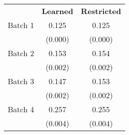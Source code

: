 
\begin{tabular}[t]{lcc}
 & \textbf{Learned}& \textbf{Restricted} \\ 
 \cmidrule(lr){2-2} \cmidrule(lr){3-3}
Batch 1 & \num{0.125} & \num{0.125}\\
 & (\num{0.000}) & (\num{0.000})\\
Batch 2 & \num{0.153} & \num{0.154}\\
 & (\num{0.002}) & (\num{0.002})\\
Batch 3 & \num{0.147} & \num{0.153}\\
 & (\num{0.002}) & (\num{0.002})\\
Batch 4 & \num{0.257} & \num{0.255}\\
 & (\num{0.004}) & (\num{0.004})\\
\end{tabular}

